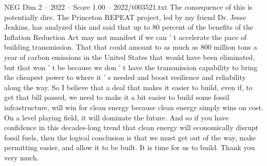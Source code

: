 \begin{textsample}{NEG Dim 2 – 2022 – Score 1.00 – 2022/t003521.txt}
The consequence of this is potentially dire.
The Princeton REPEAT project, led by my friend Dr.
Jesse Jenkins, has analyzed this and said that up to 80 percent of the benefits of the Inflation Reduction Act may not manifest if we can ' t accelerate the pace of building transmission.
That that could amount to as much as 800 million tons a year of carbon emissions in the United States that would have been eliminated, but that won ' t be because we don ' t have the transmission capability to bring the cheapest power to where it ' s needed and boost resilience and reliability along the way.
So I believe that a deal that makes it easier to build, even if, to get that bill passed, we need to make it a bit easier to build some fossil infrastructure, will win for clean energy because clean energy simply wins on cost.
On a level playing field, it will dominate the future.
And so if you have confidence in this decades-long trend that clean energy will economically disrupt fossil fuels, then the logical conclusion is that we must get out of the way, make permitting easier, and allow it to be built.
It is time for us to build.
Thank you very much.

\end{textsample}
